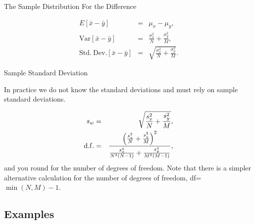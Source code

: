 \begin{frame}{The Sample Distribution For the Difference}
  
    \begin{eqnarray*}
      E[\bar{x}-\bar{y}] & = & \mu_x - \mu_y, \\
      \mathrm{Var}[\bar{x}-\bar{y}] & = & \frac{\sigma^2_x}{N} + \frac{\sigma^2_y}{M}, \\
      \mathrm{Std.~Dev.}[\bar{x}-\bar{y}] & = & \sqrt{\frac{\sigma^2_x}{N} + \frac{\sigma^2_y}{M}}.
    \end{eqnarray*}

\end{frame}

\begin{frame}{Sample Standard Deviation}

  In practice we do not know the standard deviations and must rely on
  sample standard deviations.

    \begin{eqnarray*}
      s_w & = & \sqrt{\frac{s^2_x}{N} + \frac{s^2_y}{M}}, \\
      \mathrm{d.f.} & = & \frac{\left( \frac{s_x^2}{N} + \frac{s_y^2}{M}\right)^2}{
          \frac{s_x^4}{N^2(N-1)} + \frac{s_y^4}{M^2(M-1)}},
    \end{eqnarray*}
    and you round  for the number of degrees of
    freedom. Note that there is a simpler alternative calculation for
    the number of degrees of freedom, df=$\min(N,M)-1$.
  
  
\end{frame}

\subsection{Examples}

